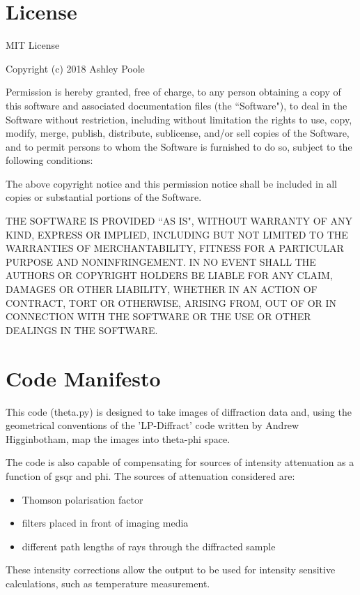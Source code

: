 \documentclass{report}
\begin{document}
\chapter{License}

MIT License

Copyright (c) 2018 Ashley Poole

Permission is hereby granted, free of charge, to any person obtaining a copy
of this software and associated documentation files (the ``Software"), to deal
in the Software without restriction, including without limitation the rights
to use, copy, modify, merge, publish, distribute, sublicense, and/or sell
copies of the Software, and to permit persons to whom the Software is
furnished to do so, subject to the following conditions:

The above copyright notice and this permission notice shall be included in all
copies or substantial portions of the Software.

THE SOFTWARE IS PROVIDED ``AS IS", WITHOUT WARRANTY OF ANY KIND, EXPRESS OR
IMPLIED, INCLUDING BUT NOT LIMITED TO THE WARRANTIES OF MERCHANTABILITY,
FITNESS FOR A PARTICULAR PURPOSE AND NONINFRINGEMENT. IN NO EVENT SHALL THE
AUTHORS OR COPYRIGHT HOLDERS BE LIABLE FOR ANY CLAIM, DAMAGES OR OTHER
LIABILITY, WHETHER IN AN ACTION OF CONTRACT, TORT OR OTHERWISE, ARISING FROM,
OUT OF OR IN CONNECTION WITH THE SOFTWARE OR THE USE OR OTHER DEALINGS IN THE
SOFTWARE.

\chapter{Code Manifesto}

This code (theta.py) is designed to take images of diffraction data and, using the geometrical conventions of the 'LP-Diffract' code written by Andrew Higginbotham, map the images into theta-phi space.

The code is also capable of compensating for sources of intensity attenuation as a function of gsqr and phi. The sources of attenuation considered are:
\begin{itemize}
\item Thomson polarisation factor
\item filters placed in front of imaging media
\item different path lengths of rays through the diffracted sample
\end{itemize} 

These intensity corrections allow the output to be used for intensity sensitive calculations, such as temperature measurement.
\end{document}
